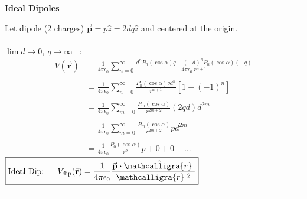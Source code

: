\documentclass[12pt]{article}
\newcommand{\scripty}[1]{\ensuremath{\mathcalligra{#1}}}
\newcommand*{\cursrr}{\scripty{r}\ }
\newcommand*{\dotP}{\boldsymbol \cdot}		%
\begin{document}
\newpage
\noindent \textbf{Ideal Dipoles}
\hfill \break \\
\begin{minipage}[t]{0.5\textwidth}
	Let dipole (2 charges) \( \vec{ \mathbf{p} } = p \hat{z} = 2dq \hat{z} \) and centered at the origin. \\ \\
	\(\lim d \rightarrow 0, \ q \rightarrow \infty \) \ :
	\begin{align*}
		V( \vec{ \mathbf{r} } ) &= \frac{1}{4 \pi \epsilon_0} \sum_{n=0}^\infty 
			\frac{ d^n P_n (\cos{\alpha}) q+ (-d)^n P_n (\cos{\alpha}) (-q) }{4 \pi \epsilon_0 \ r^{n+1}} \\ \\
		&= \frac{1}{4 \pi \epsilon_0} \sum_{n=0}^\infty \frac{ P_n (\cos{\alpha}) q d^n }{r^{n+1}} [ 1 + (-1)^n ] \\ \\
		&= \frac{1}{4 \pi \epsilon_0} \sum_{m=0}^\infty \frac{ P_m (\cos{\alpha}) }{r^{2m+2}} (2 q d) d^{2m} \\ \\
		&= \frac{1}{4 \pi \epsilon_0} \sum_{m=0}^\infty \frac{ P_m (\cos{\alpha}) }{r^{2m+2}} p d^{2m} \\ \\
		&= \frac{1}{4 \pi \epsilon_0} \frac{ P_0 (\cos{\alpha}) }{r^{2}} p + 0 + 0 + ...
	\end{align*}
	\hfill \break
	\( \boxed{ \text{Ideal Dip:} \ \ \ \ \  V_{ \text{dip} }( \vec{ \mathbf{r} } ) 
		= \frac{1}{4 \pi \epsilon_0} \frac{ \vec{ \mathbf{p} } \dotP \hat{\cursrr} }{\cursrr^{2}} } \)
\end{minipage}
\hspace{0.03\textwidth}
\rule[-388pt]{.5pt}{400pt}
\hspace{0.03\textwidth}
\end{document}
